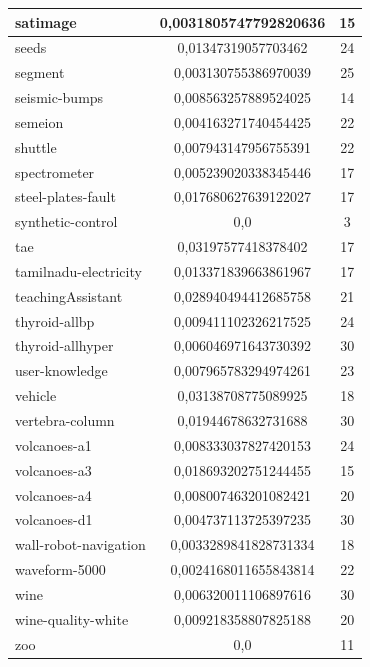 \documentclass[times,specification,annotation]{itmo-student-thesis}
\begin{document}
\begin{center}
\begin{longtable}{ |m{5cm}|c|c| }
		\hline
		satimage & 0,0031805747792820636 & 15 \\
		\hline
		seeds & 0,01347319057703462 & 24 \\
		\hline
		segment & 0,003130755386970039 & 25 \\
		\hline
		seismic-bumps & 0,008563257889524025 & 14 \\
		\hline
		semeion & 0,004163271740454425 & 22 \\
		\hline
		shuttle & 0,007943147956755391 & 22 \\
		\hline
		spectrometer & 0,005239020338345446 & 17 \\
		\hline
		steel-plates-fault & 0,017680627639122027 & 17 \\
		\hline
		synthetic-control & 0,0 & 3 \\
		\hline
		tae & 0,03197577418378402 & 17 \\
		\hline
		tamilnadu-electricity & 0,013371839663861967 & 17 \\
		\hline
		teachingAssistant & 0,028940494412685758 & 21 \\
		\hline
		thyroid-allbp & 0,009411102326217525 & 24 \\
		\hline
		thyroid-allhyper & 0,006046971643730392 & 30 \\
		\hline
		user-knowledge & 0,007965783294974261 & 23 \\
		\hline
		vehicle & 0,03138708775089925 & 18 \\
		\hline
		vertebra-column & 0,01944678632731688 & 30 \\
		\hline
		volcanoes-a1 & 0,008333037827420153 & 24 \\
		\hline
		volcanoes-a3 & 0,018693202751244455 & 15 \\
		\hline
		volcanoes-a4 & 0,008007463201082421 & 20 \\
		\hline
		volcanoes-d1 & 0,004737113725397235 & 30 \\
		\hline
		wall-robot-navigation & 0,0033289841828731334 & 18 \\
		\hline
		waveform-5000 & 0,0024168011655843814 & 22 \\
		\hline
		wine & 0,006320011106897616 & 30 \\
		\hline
		wine-quality-white & 0,009218358807825188 & 20 \\
		\hline
		zoo & 0,0 & 11 \\
		\hline
	\end{longtable}
\end{center} 
\end{document}
